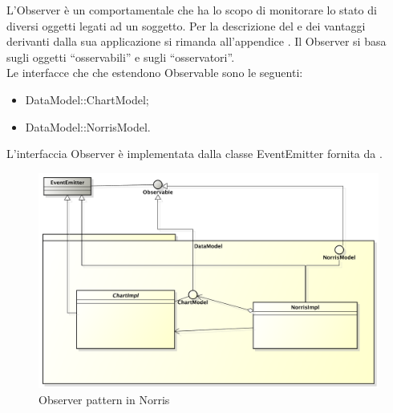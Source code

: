 			L'Observer è un  comportamentale che ha lo scopo di monitorare lo stato di diversi oggetti legati ad un soggetto.
			Per la descrizione del  e dei vantaggi derivanti dalla sua applicazione si rimanda all'appendice .
				Il  Observer si basa sugli oggetti “osservabili” e sugli “osservatori”.\\
				Le interfacce che che estendono Observable sono le seguenti:
				\begin{itemize}
					\item DataModel::ChartModel;
					\item DataModel::NorrisModel.
				\end{itemize}
				L'interfaccia Observer è implementata dalla classe EventEmitter fornita da .
				\begin{figure}[H]\centering
	        		\includegraphics[width=\textwidth]{SpecificaTecnica/Pics/DesignPatternNorris/Observer}
	        		\caption{Observer pattern in Norris}
	    		\end{figure}
		
